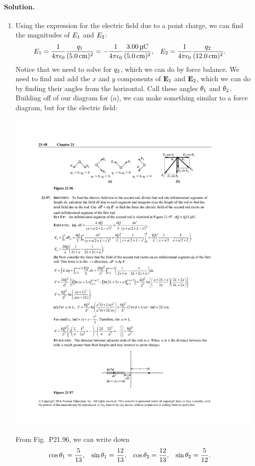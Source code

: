 \documentclass[11pt]{article}
\newenvironment{solution}
{
    \paragraph{Solution.}
    \ignorespaces
}
{
    \bigskip
}
\begin{document}
\begin{solution}
\begin{enumerate}
		\item Using the expression for the electric field due to a point charge, we can find the magnitudes of $E_1$ and $E_2$:
		\begin{align*}
			\Eq &= \fk \frac{\qq}{(\SI{5.0}{\cm})^2} = -\fk \frac{\SI{3.00}{\micro\coulomb}}{(\SI{5.0}{\cm})^2}, &
			\Ew &= \fk \frac{\qw}{(\SI{12.0}{\cm})^2}.
		\end{align*}
		Notice that we need to solve for $q_2$, which we can do by force balance.  We need to find and add the $x$ and $y$ components of $\mathbf{E}_1$ and $\mathbf{E}_2$, which we can do by finding their angles from the horizontal.  Call these angles $\theta_1$ and $\theta_2$.  Building off of our diagram for (a), we can make something similar to a force diagram, but for the electric field:
		
		\begin{center}
			\includegraphics[scale=1.5]{P21-96b}
		\end{center}
		
		From Fig.~P21.96, we can write down
		\begin{align*}
			\cos\theta_1 &= \frac{5}{13}, &
			\sin\theta_1 &= \frac{12}{13}, &
			\cos\theta_2 &= \frac{12}{13}, &
			\sin\theta_2 &= \frac{5}{12}.
		\end{align*}
		

\end{enumerate}
\end{solution}
\end{document}
